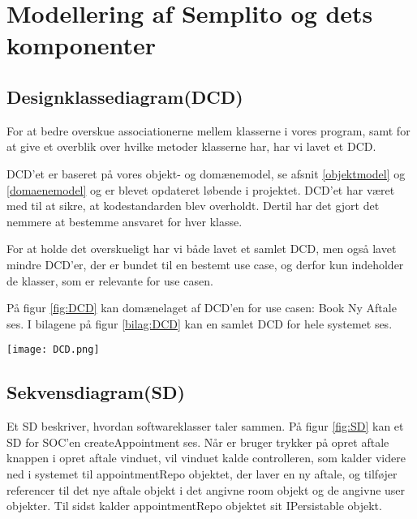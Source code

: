\section{Modellering af Semplito og dets komponenter}
\subsection{Designklassediagram(DCD)}
\label{DCD}

For at bedre overskue associationerne mellem klasserne i vores program, samt for at give et overblik over hvilke metoder klasserne har, har vi lavet et DCD. 

DCD'et er baseret på vores objekt- og domænemodel, se afsnit \ref{objektmodel} og \ref{domaenemodel} og er blevet opdateret løbende i projektet.
DCD'et har været med til at sikre, at kodestandarden blev overholdt.
Dertil har det gjort det nemmere at bestemme ansvaret for hver klasse.

For at holde det overskueligt har vi både lavet et samlet DCD, men også lavet mindre DCD'er, der er bundet til en bestemt use case, og derfor kun indeholder de klasser, som er relevante for use casen.

På figur \ref{fig:DCD} kan domænelaget af DCD'en for use casen: Book Ny Aftale ses.
I bilagene på figur \ref{bilag:DCD} kan en samlet DCD for hele systemet ses.


\begin{sidewaysfigure}
    \caption{DCD for Semplito - Bookingsystemet}
    \centering
        \texttt{[image: DCD.png]}
    \label{fig:DCD}
\end{sidewaysfigure}

\subsection{Sekvensdiagram(SD)}
\label{SD}

Et SD beskriver, hvordan softwareklasser taler sammen.
På figur \ref{fig:SD} kan et SD for SOC'en createAppointment ses.
Når er bruger trykker på opret aftale knappen i opret aftale vinduet, vil vinduet kalde controlleren, som kalder videre ned i systemet til appointmentRepo objektet, der laver en ny aftale, og tilføjer referencer til det nye aftale objekt i det angivne room objekt og de angivne user objekter.
Til sidst kalder appointmentRepo objektet sit IPersistable objekt.

